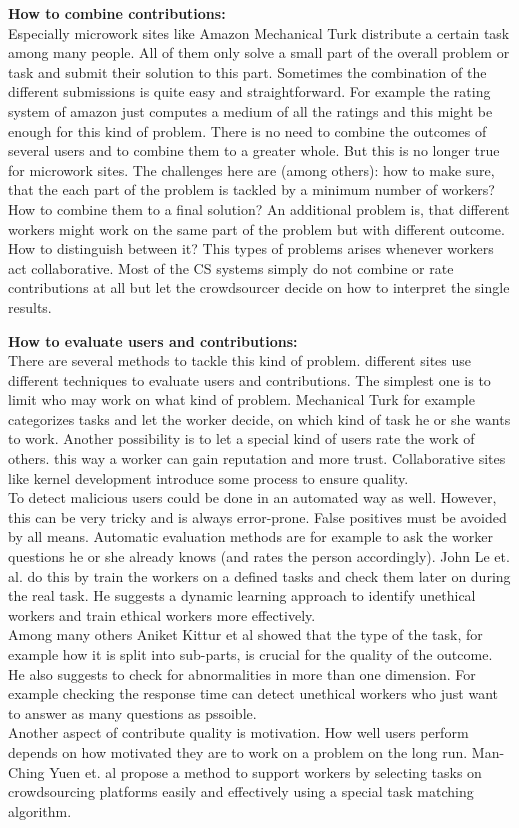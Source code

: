 \documentclass{acm_proc_article-sp}
\begin{document}
\textbf{How to combine contributions: }\\
Especially microwork sites like Amazon Mechanical Turk distribute a certain task among many people. All of them only solve a small part of the overall problem or task and submit their solution to this part. Sometimes the combination of the different submissions is quite easy and straightforward. For example the rating system of amazon just computes a medium of all the ratings and this might be enough for this kind of problem. There is no need to combine the outcomes of several users and to combine them to a greater whole. But this is no longer true for microwork sites. The challenges here are (among others): how to make sure, that the each part of the problem is tackled by a minimum number of workers? How to combine them to a final solution? An additional problem is, that different workers might work on the same part of the problem but with different outcome. How to distinguish between it? This types of problems arises whenever workers act collaborative. Most of the CS systems simply do not combine or rate contributions at all but let the crowdsourcer decide on how to interpret the single results.

\textbf{How to evaluate users and contributions: }\\ 
There are several methods to tackle this kind of problem. different sites use different techniques to evaluate users and contributions. The simplest one is to limit who may work on what kind of problem. Mechanical Turk for example categorizes tasks and let the worker decide, on which  kind of task he or she wants to work. Another possibility is to let a special kind of users rate the work of others. this way a worker can gain reputation and more trust. Collaborative sites like kernel development introduce some process to ensure quality.\\
To detect malicious users could be done in an automated way as well. However, this can be very tricky and is always error-prone. False positives must be avoided by all means. Automatic evaluation methods are for example to ask the worker questions he or she already knows (and rates the person accordingly). John Le et. al.\cite{le:ensure} do this by train the workers on a defined tasks and check them later on during the real task. He suggests a dynamic learning approach to identify unethical workers and train ethical workers more effectively.\\
Among many others Aniket Kittur et al showed that the type of the task, for example how it is split into sub-parts, is crucial for the quality of the outcome\cite{kittur:studies}. He also suggests to check for abnormalities in more than one dimension. For example checking the response time can detect unethical workers who just want to answer as many questions as pssoible.\\
Another aspect of contribute quality is motivation. How well users perform depends on how motivated they are to work on a problem on the long run. Man-Ching Yuen et. al propose a method to support workers by selecting tasks on crowdsourcing platforms easily and effectively using a special task matching algorithm\cite{yuen:select}.
\pagebreak
\end{document}
